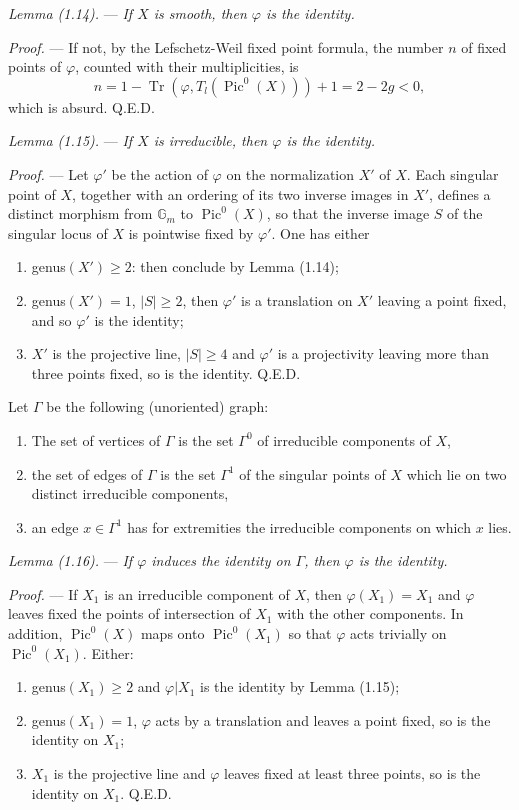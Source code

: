 \documentclass[10pt]{article}
\newcommand{\Pic}{\operatorname{Pic}}
\newcommand{\QED}{\hfill Q.E.D.}
\begin{document}
\medskip
\noindent\emph{Lemma (1.14).} --- \emph{If $X$ is smooth, then $\varphi$ is the identity.}

\noindent\emph{Proof.} --- If not, by the Lefschetz-Weil fixed point formula, the number $n$ of fixed points of $\varphi$, counted with their multiplicities, is
\[
n=1-\operatorname{Tr}(\varphi,T_l(\Pic^0(X)))+1=2-2g<0,
\]
which is absurd. \QED

\medskip
\noindent\emph{Lemma (1.15).} --- \emph{If $X$ is irreducible, then $\varphi$ is the identity.}

\noindent\emph{Proof.} --- Let $\varphi'$ be the action of $\varphi$ on the normalization $X'$ of $X$. Each singular point of $X$, together with an ordering of its two inverse images in $X'$, defines a distinct morphism from $\mathbb G_m$ to $\Pic^0(X)$, so that the inverse image $S$ of the singular locus of $X$ is pointwise fixed by $\varphi'$. One has either
\begin{enumerate}[label=\emph{\alph*)}]
\item genus$(X')\geq2$: then conclude by Lemma (1.14);
\item genus$(X')=1$, $|S|\geq2$, then $\varphi'$ is a translation on $X'$ leaving a point fixed, and so $\varphi'$ is the identity;
\item $X'$ is the projective line, $|S|\geq4$ and $\varphi'$ is a projectivity leaving more than three points fixed, so is the identity. \QED
\end{enumerate}


Let $\Gamma$ be the following (unoriented) graph:
\begin{enumerate}[label=(\roman*)]
\item The set of vertices of $\Gamma$ is the set $\Gamma^0$ of irreducible components of $X$,
\item the set of edges of $\Gamma$ is the set $\Gamma^1$ of the singular points of $X$ which lie on two distinct irreducible components,
\item an edge $x\in\Gamma^1$ has for extremities the irreducible components on which $x$ lies.
\end{enumerate}

\medskip
\noindent\emph{Lemma (1.16).} --- \emph{If $\varphi$ induces the identity on $\Gamma$, then $\varphi$ is the identity.}

\noindent\emph{Proof.} --- If $X_1$ is an irreducible component of $X$, then $\varphi(X_1)=X_1$ and $\varphi$ leaves fixed the points of intersection of $X_1$ with the other components. In addition, $\Pic^0(X)$ maps onto $\Pic^0(X_1)$ so that $\varphi$ acts trivially on $\Pic^0(X_1)$. Either:
\begin{enumerate}[label=\emph{\alph*)}]
\item genus$(X_1)\geq2$ and $\varphi|X_1$ is the identity by Lemma (1.15);
\item genus$(X_1)=1$, $\varphi$ acts by a translation and leaves a point fixed, so is the identity on $X_1$;
\item $X_1$ is the projective line and $\varphi$ leaves fixed at least three points, so is the identity on $X_1$. \QED
\end{enumerate}
\end{document}
